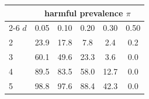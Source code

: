 \begin{tabular}{lccccc}
\toprule
 & \multicolumn{5}{c}{harmful prevalence $\pi$} \\
\cmidrule(lr){2-6}
$d$ & 0.05 & 0.10 & 0.20 & 0.30 & 0.50 \\
\midrule
2 & 23.9 & 17.8 & 7.8 & 2.4 & 0.2 \\
3 & 60.1 & 49.6 & 23.3 & 3.6 & 0.0 \\
4 & 89.5 & 83.5 & 58.0 & 12.7 & 0.0 \\
5 & 98.8 & 97.6 & 88.4 & 42.3 & 0.0 \\
\bottomrule
\end{tabular}
